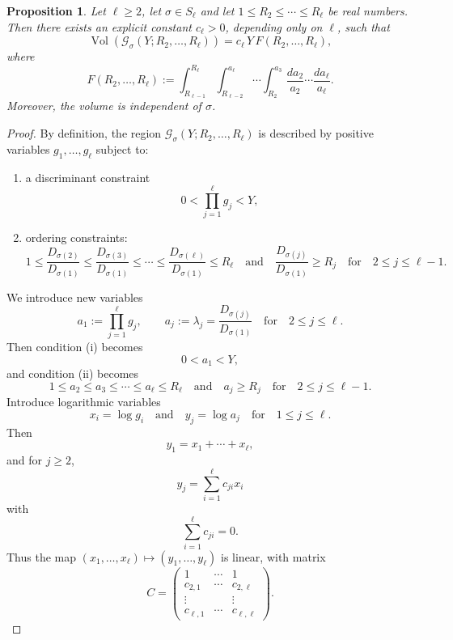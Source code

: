 \documentclass{amsart}
\newcommand{\op}[1]{\operatorname{#1}}
\theoremstyle{plain}
\newtheorem{proposition}[theorem]{Proposition}
\theoremstyle{definition}
\theoremstyle{remark}
\numberwithin{equation}{section}
\begin{document}
\begin{proposition}\label{prop:volume-G-sigma}
Let $\ell \ge 2$, let $\sigma\in S_\ell$
and let $1\leq R_2 \le \cdots \le R_\ell$ be real numbers.
Then there exists an explicit constant $c_\ell>0$, depending only on $\ell$,
such that
\[
\op{Vol}\!\left(\mathcal G_\sigma(Y;R_2,\dots,R_\ell)\right)
=
c_\ell\, Y\, F(R_2,\dots,R_\ell),
\]
where
\[
F(R_2,\dots,R_\ell)
:=
\int_{R_{\ell-1}}^{R_\ell}
\int_{R_{\ell-2}}^{a_\ell}
\cdots
\int_{R_2}^{a_3}
\frac{da_2}{a_2}
\cdots
\frac{da_\ell}{a_\ell}.
\]
Moreover, the volume is independent of $\sigma$.
\end{proposition}

\begin{proof}
\par By definition, the region $\mathcal G_{\sigma}(Y;R_2,\dots,R_\ell)$ is described by positive
variables $g_1,\dots,g_\ell$ subject to:
\begin{enumerate}
\item[(i)] a discriminant constraint
\[
0<\prod_{j=1}^{\ell} g_j < Y,
\]
\item[(ii)] ordering constraints:
\[
1\leq \frac{D_{\sigma(2)}}{D_{\sigma(1)}}\le \frac{D_{\sigma(3)}}{D_{\sigma(1)}} \le \cdots \le \frac{D_{\sigma(\ell)}}{D_{\sigma(1)}} \le R_\ell\quad \text{and}\quad \frac{D_{\sigma(j)}}{D_{\sigma(1)}}\geq R_j\quad \text{for}\quad 2\leq j\leq \ell-1.
\]
\end{enumerate}
\noindent We introduce new variables
\[
a_1 := \prod_{j=1}^{\ell} g_j,
\qquad
a_j := \lambda_{j}=\frac{D_{\sigma(j)}}{D_{\sigma(1)}} \quad \text{for}\quad 2\le j\le \ell.
\]
Then condition (i) becomes
\[
0<a_1<Y,
\]
and condition (ii) becomes
\[
1\leq a_2 \le a_3 \le \cdots \le a_\ell \le R_\ell\quad \text{and}\quad a_j\geq R_j\quad \text{for}\quad 2\leq j\leq \ell-1.
\]
Introduce logarithmic variables
\[
x_i=\log g_i\quad \text{and}\quad
y_j=\log a_j \quad \text{for} \quad 1\le j\le \ell.
\]
Then
\[
y_1=x_1+\cdots+x_\ell,
\]
and for $j\ge2$,
\[
y_j=\sum_{i=1}^{\ell} c_{ji}x_i
\]
with
\[
\sum_{i=1}^{\ell} c_{ji}=0.
\]
Thus the map $(x_1, \dots, x_\ell)\mapsto (y_1, \dots, y_\ell)$ is linear, with matrix
\begin{equation}\label{defn of C}C= \begin{pmatrix} 1 & \cdots & 1 \\ c_{2,1} & \cdots & c_{2,\ell} \\ \vdots & & \vdots \\ c_{\ell,1} & \cdots & c_{\ell,\ell} \end{pmatrix}.

\end{equation}
\end{proof}
\end{document}
